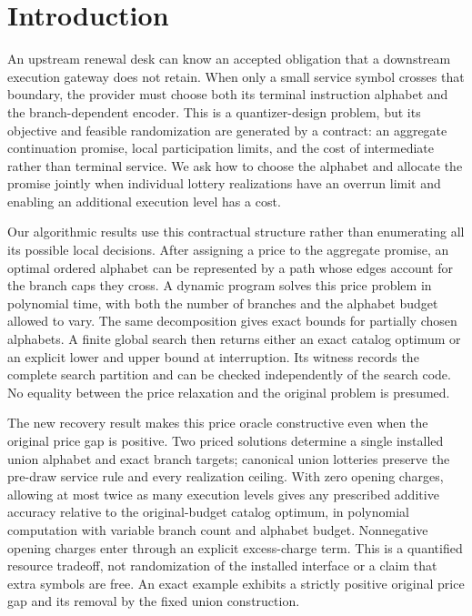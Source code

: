 \section{Introduction}
An upstream renewal desk can know an accepted obligation that a downstream execution gateway does not retain. When only a small service symbol crosses that boundary, the provider must choose both its terminal instruction alphabet and the branch-dependent encoder. This is a quantizer-design problem, but its objective and feasible randomization are generated by a contract: an aggregate continuation promise, local participation limits, and the cost of intermediate rather than terminal service. We ask how to choose the alphabet and allocate the promise jointly when individual lottery realizations have an overrun limit and enabling an additional execution level has a cost.

Our algorithmic results use this contractual structure rather than enumerating all its possible local decisions. After assigning a price to the aggregate promise, an optimal ordered alphabet can be represented by a path whose edges account for the branch caps they cross. A dynamic program solves this price problem in polynomial time, with both the number of branches and the alphabet budget allowed to vary. The same decomposition gives exact bounds for partially chosen alphabets. A finite global search then returns either an exact catalog optimum or an explicit lower and upper bound at interruption. Its witness records the complete search partition and can be checked independently of the search code. No equality between the price relaxation and the original problem is presumed.

The new recovery result makes this price oracle constructive even when the original price gap is positive. Two priced solutions determine a single installed union alphabet and exact branch targets; canonical union lotteries preserve the pre-draw service rule and every realization ceiling. With zero opening charges, allowing at most twice as many execution levels gives any prescribed additive accuracy relative to the original-budget catalog optimum, in polynomial computation with variable branch count and alphabet budget. Nonnegative opening charges enter through an explicit excess-charge term. This is a quantified resource tradeoff, not randomization of the installed interface or a claim that extra symbols are free. An exact example exhibits a strictly positive original price gap and its removal by the fixed union construction.

